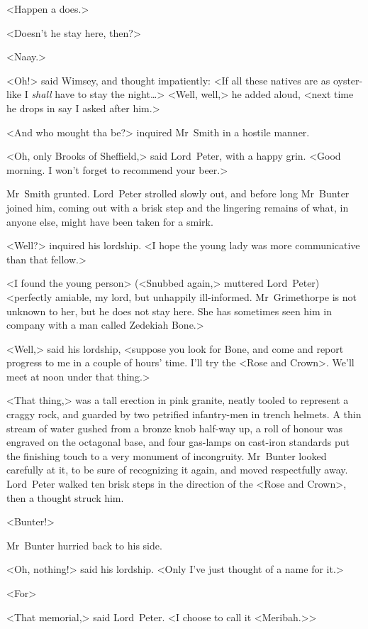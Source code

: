 <Happen a does.>

<Doesn't he stay here, then?>

<Naay.>

<Oh!> said Wimsey, and thought impatiently: <If all these natives are as oyster-like I \emph{shall} have to stay the night\dots> <Well, well,> he added aloud, <next time he drops in say I asked after him.>

<And who mought tha be?> inquired Mr~Smith in a hostile manner.

<Oh, only Brooks of Sheffield,> said Lord~Peter, with a happy grin. <Good morning. I won't forget to recommend your beer.>

Mr~Smith grunted. Lord~Peter strolled slowly out, and before long Mr~Bunter joined him, coming out with a brisk step and the lingering remains of what, in anyone else, might have been taken for a smirk.

<Well?> inquired his lordship. <I hope the young lady was more communicative than that fellow.>

<I found the young person> (<Snubbed again,> muttered Lord~Peter) <perfectly amiable, my lord, but unhappily ill-informed. Mr~Grimethorpe is not unknown to her, but he does not stay here. She has sometimes seen him in company with a man called Zedekiah Bone.>

<Well,> said his lordship, <suppose you look for Bone, and come and report progress to me in a couple of hours' time. I'll try the <Rose and Crown>. We'll meet at noon under that thing.>

<That thing,> was a tall erection in pink granite, neatly tooled to represent a craggy rock, and guarded by two petrified infantry-men in trench helmets. A thin stream of water gushed from a bronze knob half-way up, a roll of honour was engraved on the octagonal base, and four gas-lamps on cast-iron standards put the finishing touch to a very monument of incongruity. Mr~Bunter looked carefully at it, to be sure of recognizing it again, and moved respectfully away. Lord~Peter walked ten brisk steps in the direction of the <Rose and Crown>, then a thought struck him.

<Bunter!>

Mr~Bunter hurried back to his side.

<Oh, nothing!> said his lordship. <Only I've just thought of a name for it.>

<For\longdash>

<That memorial,> said Lord~Peter. <I choose to call it <Meribah.>>

